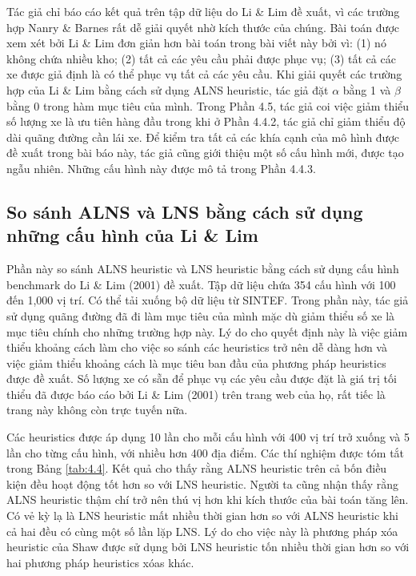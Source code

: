 Tác giả chỉ báo cáo kết quả trên tập dữ liệu do Li \& Lim đề xuất, vì các trường hợp Nanry \& Barnes rất dễ giải quyết nhờ kích thước của chúng.
Bài toán được xem xét bởi Li \& Lim đơn giản hơn bài toán trong bài viết này bởi vì: (1) nó không chứa nhiều kho; (2) tất cả các yêu cầu phải được phục vụ; (3) tất cả các xe được giả định là có thể phục vụ tất cả các yêu cầu. Khi giải quyết các trường hợp của Li \& Lim bằng cách sử dụng ALNS heuristic, tác giả đặt $\alpha$ bằng 1 và $\beta$ bằng 0 trong hàm mục tiêu của mình. Trong Phần 4.5, tác giả coi việc giảm thiểu số lượng xe là ưu tiên hàng đầu trong khi ở Phần 4.4.2, tác giả chỉ giảm thiểu độ dài quãng đường cần lái xe.
Để kiểm tra tất cả các khía cạnh của mô hình được đề xuất trong bài báo này, tác giả cũng giới thiệu một số cấu hình mới, được tạo ngẫu nhiên. Những cấu hình này được mô tả trong Phần 4.4.3.

\subsection{So sánh ALNS và LNS bằng cách sử dụng những cấu hình của Li \& Lim}
Phần này so sánh ALNS heuristic và LNS heuristic bằng cách sử dụng cấu hình benchmark do Li \& Lim (2001) đề xuất. Tập dữ liệu chứa 354 cấu hình với 100 đến 1,000 vị trí. Có thể tải xuống bộ dữ liệu từ SINTEF.
Trong phần này, tác giả sử dụng quãng đường đã đi làm mục tiêu của mình mặc dù giảm thiểu số xe là mục tiêu chính cho những trường hợp này. Lý do cho quyết định này là việc giảm thiểu khoảng cách làm cho việc so sánh các heuristics trở nên dễ dàng hơn và việc giảm thiểu khoảng cách là mục tiêu ban đầu của phương pháp heuristics được đề xuất. Số lượng xe có sẵn để phục vụ các yêu cầu được đặt là giá trị tối thiểu đã được báo cáo bởi Li \& Lim (2001) trên trang web của họ, rất tiếc là trang này không còn trực tuyến nữa.

Các heuristics được áp dụng 10 lần cho mỗi cấu hình với 400 vị trí trở xuống và 5 lần cho từng cấu hình, với nhiều hơn 400 địa điểm. Các thí nghiệm được tóm tắt trong Bảng \ref{tab:4.4}.
Kết quả cho thấy rằng ALNS heuristic trên cả bốn điều kiện đều hoạt động tốt hơn so với LNS heuristic. Người ta cũng nhận thấy rằng ALNS heuristic thậm chí trở nên thú vị hơn khi kích thước của bài toán tăng lên. Có vẻ kỳ lạ là LNS heuristic mất nhiều thời gian hơn so với ALNS heuristic khi cả hai đều có cùng một số lần lặp LNS. Lý do cho việc này là phương pháp xóa heuristic của Shaw được sử dụng bởi LNS heuristic tốn nhiều thời gian hơn so với hai phương pháp heuristics xóas khác.

